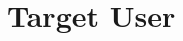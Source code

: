 \begin{enumerate}[leftmargin=80pt]
\end{enumerate}

\section{Target User}
\label{section:target-user}






